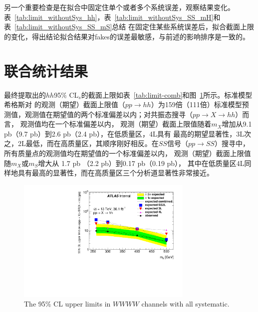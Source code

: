 另一个重要检查是在拟合中固定住单个或者多个系统误差，观察结果变化。表~\ref{tab:limit_withoutSys_hh}，表~\ref{tab:limit_withoutSys_SS_mH}和表~\ref{tab:limit_withoutSys_SS_mS}总结
在固定住某些系统误差后，拟合截面上限的变化，得出结论拟合结果对fakes的误差最敏感，与前述的影响排序是一致的。

\clearpage

\section{联合统计结果}
最终提取出的$hh$95\% CL$_s$的截面上限如表~\ref{tab:limit-comb}和图~\ref{fig:limit-comb}所示。标准模型希格斯对
的观测（期望）截面上限值（$pp\rightarrow hh$）为159倍（111倍）标准模型预测值，观测值在期望值的两个标准偏差以内；对共振态搜寻（$pp\rightarrow X\rightarrow hh$）而言，
观测值均在一个标准偏差以内，
观测（期望）截面上限值随着$m_X$增加从9.1 pb（9.7 pb）到2.6 pb（2.4 pb），在低质量区，4L具有
最高的期望显著性，3L次之，2L最低，而在高质量区，其顺序刚好相反。在$SS$信号（$pp\rightarrow SS$）搜寻中，所有质量点的观测值均在期望值的一个标准偏差以内，
观测（期望）截面上限值随$m_X$或$m_S$增大从
1.7 pb （2.2 pb）到0.17 pb（0.19 pb），
其中在低质量区4L同样地具有最高的显著性，而在高质量区三个分析道显著性非常接近。
\begin{figure}[!h!tpb]
  \centering
 \includegraphics[width=0.75\textwidth,angle=-90]{fig/Statistical/combination/limit-comb-hh-AllSys.pdf}
 \caption{The 95\% CL upper limits in $WWWW$ channels with all systematic.}
 \label{fig:limit-comb}
\end{figure}
